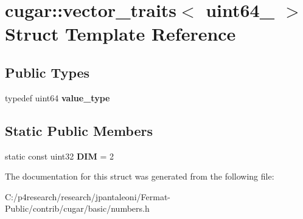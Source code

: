 \hypertarget{structcugar_1_1vector__traits_3_01uint64__2_01_4}{}\section{cugar\+:\+:vector\+\_\+traits$<$ uint64\+\_ $>$ Struct Template Reference}
\label{structcugar_1_1vector__traits_3_01uint64__2_01_4}
\subsection*{Public Types}
\begin{DoxyCompactItemize}
\item 
\mbox{\label{structcugar_1_1vector__traits_3_01uint64__2_01_4_a58f055cafee4758929346ebee053c1b6}} 
typedef uint64 {\bfseries value\+\_\+type}
\end{DoxyCompactItemize}
\subsection*{Static Public Members}
\begin{DoxyCompactItemize}
\item 
\mbox{\label{structcugar_1_1vector__traits_3_01uint64__2_01_4_a4f854fae2d6f5724a25e0dcfd26dfda5}} 
static const uint32 {\bfseries D\+IM} = 2
\end{DoxyCompactItemize}


The documentation for this struct was generated from the following file\+:\begin{DoxyCompactItemize}
\item 
C\+:/p4research/research/jpantaleoni/\+Fermat-\/\+Public/contrib/cugar/basic/numbers.\+h\end{DoxyCompactItemize}

